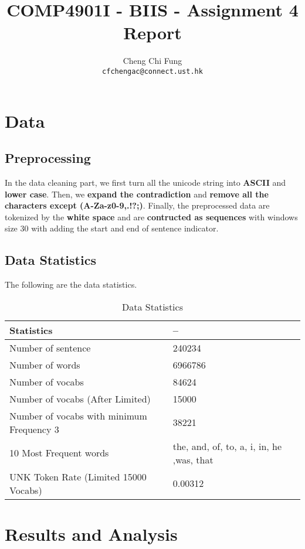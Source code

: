 \documentclass{article}
\title{COMP4901I - BIIS - Assignment 4 Report}
\author{%
	Cheng Chi Fung \\
	\texttt{cfchengac@connect.ust.hk} \\
}
\begin{document}
\maketitle

\section{Data}

\subsection{Preprocessing}

In the data cleaning part, we first turn all the unicode string into \textbf{ASCII} and \textbf{lower case}. Then, we \textbf{expand the contradiction} and \textbf{remove all the characters except (A-Za-z0-9,.!?;)}. Finally, the preprocessed data are tokenized by the \textbf{white space} and are  \textbf{contructed as sequences} with windows size 30 with adding the start and end of sentence indicator.

\subsection{Data Statistics}
The following are the data statistics.

\begin{table}[htb]
	\caption{Data Statistics}
	\label{sample-table}
	\centering
	\begin{tabular}{ll}
		\toprule
		\cmidrule{1-2}
		Statistics & --  \\
		\midrule
		Number of sentence & 240234 \\
		Number of words & 6966786  \\
		Number of vocabs & 84624 \\
		Number of vocabs (After Limited) & 15000 \\
		Number of vocabs with minimum Frequency 3 & 38221 \\
		10 Most Frequent words & the, and, of, to, a, i, in, he ,was, that \\
		UNK Token Rate (Limited 15000 Vocabs) & 0.00312 \\
		\bottomrule
	\end{tabular}
\end{table}

\section{Results and Analysis}
\end{document}
